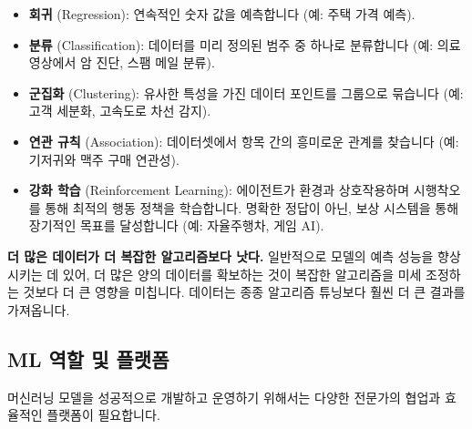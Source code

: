 \documentclass[11pt,a4paper]{article}
\theoremstyle{definition}
\begin{document}
\begin{tcolorbox}[summarybox={다양한 머신러닝 유형}]
\begin{itemize}
    \item \textbf{회귀} (Regression): 연속적인 숫자 값을 예측합니다 (예: 주택 가격 예측).
    \item \textbf{분류} (Classification): 데이터를 미리 정의된 범주 중 하나로 분류합니다 (예: 의료 영상에서 암 진단, 스팸 메일 분류).
    \item \textbf{군집화} (Clustering): 유사한 특성을 가진 데이터 포인트를 그룹으로 묶습니다 (예: 고객 세분화, 고속도로 차선 감지).
    \item \textbf{연관 규칙} (Association): 데이터셋에서 항목 간의 흥미로운 관계를 찾습니다 (예: 기저귀와 맥주 구매 연관성).
    \item \textbf{강화 학습} (Reinforcement Learning): 에이전트가 환경과 상호작용하며 시행착오를 통해 최적의 행동 정책을 학습합니다. 명확한 정답이 아닌, 보상 시스템을 통해 장기적인 목표를 달성합니다 (예: 자율주행차, 게임 AI).
\end{itemize}
\end{tcolorbox}

\begin{tcolorbox}[warningbox={데이터의 중요성}]
\textbf{더 많은 데이터가 더 복잡한 알고리즘보다 낫다.}
일반적으로 모델의 예측 성능을 향상시키는 데 있어, 더 많은 양의 데이터를 확보하는 것이 복잡한 알고리즘을 미세 조정하는 것보다 더 큰 영향을 미칩니다. 데이터는 종종 알고리즘 튜닝보다 훨씬 더 큰 결과를 가져옵니다.
\end{tcolorbox}

\subsection*{ML 역할 및 플랫폼}
머신러닝 모델을 성공적으로 개발하고 운영하기 위해서는 다양한 전문가의 협업과 효율적인 플랫폼이 필요합니다.
\end{document}
